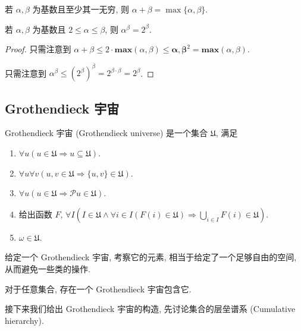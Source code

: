 \begin{corollary}
    若 \(\alpha, \beta\) 为基数且至少其一无穷, 则 \(\alpha + \beta = \max \{\alpha, \beta\}\).

    若 \(\alpha, \beta\) 为基数且 \(2 \le \alpha \le \beta\), 则 \(\alpha^\beta = 2^\beta\).

    \begin{proof}
        只需注意到 \(\alpha + \beta \le 2 \cdot \mathbf{max} (\alpha, \beta) \le \mathbf{\alpha, \beta}^2 = \mathbf{max} (\alpha, \beta)\).

        只需注意到 \(\alpha^\beta \le {(2^\beta)}^\beta = 2^{\beta \cdot \beta} = 2^\beta\).
    \end{proof}
\end{corollary}

\subsection{Grothendieck 宇宙}

\begin{definition}
    Grothendieck 宇宙 (Grothendieck universe) 是一个集合 \(\mathfrak{U}\), 满足
    \begin{enumerate}
        \item \(\forall u (u \in \mathfrak{U} \Rightarrow u \subseteq \mathfrak{U})\).
        \item \(\forall u \forall v (u, v \in \mathfrak{U} \Rightarrow \{u,v\} \in \mathfrak{U})\).
        \item \(\forall u (u \in \mathfrak{U} \Rightarrow \mathcal{P} u \in \mathfrak{U})\).
        \item 给出函数 \(F\), \(\forall I (I \in \mathfrak{U} \land \forall i \in I (F(i) \in \mathfrak{U}) \Rightarrow \bigcup_{i \in I} F(i) \in \mathfrak{U})\).
        \item \(\omega \in \mathfrak{U}\).
    \end{enumerate}
\end{definition}

给定一个 Grothendieck 宇宙, 考察它的元素, 相当于给定了一个足够自由的空间, 从而避免一些类的操作.

\begin{hypnosis*}
    [Grothendieck] \label{hypnosis:Grothendieck universe}
    对于任意集合, 存在一个 Grothendieck 宇宙包含它.
\end{hypnosis*}

接下来我们给出 Grothendieck 宇宙的构造, 先讨论集合的层垒谱系 (Cumulative hierarchy).

